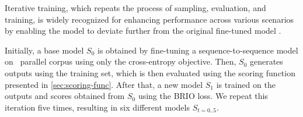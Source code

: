 Iterative training, which repeats the process of sampling, evaluation, and training, is widely recognized for enhancing performance across various scenarios by enabling the model to deviate further from the original fine-tuned model \citep{iterrpo, multiturn-dpo}.

Initially, a base model $S_{0}$ is obtained by fine-tuning a sequence-to-sequence model on \nltofol\ parallel corpus using only the cross-entropy objective. Then, $S_0$ generates outputs using the training set, which is then evaluated using the scoring function presented in \ref{sec:scoring-func}. After that, a new model $S_{1}$ is trained on the outputs and scores obtained from $S_0$ using the BRIO loss. We repeat this iteration five times, resulting in six different models $S_{t=0..5}$.